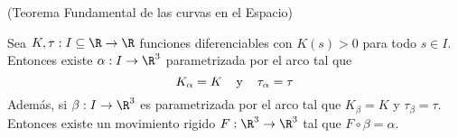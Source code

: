 \documentclass{article}
\begin{document}
\begin{teo}
    (Teorema Fundamental de las curvas en el Espacio)
    
    Sea $K,\tau: I\subseteq\R\to\R$ funciones diferenciables con $K(s)>0$ para todo $s\in I$.
    Entonces existe $\alpha:I\to\R^{3}$ parametrizada por el arco tal que
    \begin{equation*}
        K_{\alpha}=K\hspace{4mm}\text{y}\hspace{4mm}\tau_{\alpha}=\tau
    \end{equation*}
    Además, si $\beta:I\to\R^{3}$ es parametrizada por el arco tal que $K_{\beta}=K$ y 
    $\tau_{\beta}=\tau$. Entonces existe un movimiento rigido $F:\R^{3}\to\R^{3}$ tal que
    $F\circ\beta=\alpha$.
\end{teo}

\end{document}
